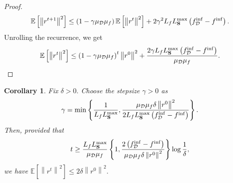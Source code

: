 \documentclass{article}
\newcommand{\bb}{\mathbb}
\newcommand{\Exp}[1]{{\bb E}\left[#1\right]}
\theoremstyle{plain}
\newtheorem{corollary}{Corollary}
\newcommand{\tf}{f_{\mathcal{D}}}
\newcommand{\mS}{{\bf S}}
\theoremstyle{plain}
\theoremstyle{definition}
\theoremstyle{remark}
\begin{document}
\begin{proof}
\begin{equation*}
	\begin{split}
		\Exp{\left\|r^{t+1}\right\|^2} & \leq \left(1-\gamma\mu_{\mathcal{D}}\mu_f\right)\Exp{\left\|r^{t}\right\|^2} + 2\gamma^2L_fL_{\mS}^{\max}\left(\tf^{\inf} - f^{\inf}\right).\\
	\end{split}
\end{equation*}
Unrolling the recurrence, we get
\begin{equation*}
	\Exp{\left\|r^{t}\right\|^2} \leq \left(1-\gamma\mu_{\mathcal{D}}\mu_f\right)^t\left\|r^0\right\|^2 + \frac{2\gamma L_fL_{\mS}^{\max}\left(\tf^{\inf} - f^{\inf}\right)}{\mu_{\mathcal{D}}\mu_f}.
\end{equation*}
\end{proof}
\begin{corollary}
	Fix $\delta > 0.$ Choose the stepsize $\gamma>0$ as
	\begin{equation*}
		\gamma = \min\left\lbrace \frac{1}{L_fL_{\mS}^{\max}}, \frac{\mu_{\mathcal{D}}\mu_f\delta\left\|r^0\right\|^2}{2L_fL_{\mS}^{\max}\left(\tf^{\inf} - f^{\inf}\right)}\right\rbrace.
	\end{equation*}
	Then, provided that
	\begin{equation*}
		t \geq \frac{L_fL_{\mS}^{\max}}{\mu_{\mathcal{D}}\mu_f}\left\lbrace 1, \frac{2\left(\tf^{\inf} - f^{\inf}\right)}{\mu_{\mathcal{D}}\mu_f\delta\left\|r^0\right\|^2}\right\rbrace \log\frac{1}{\delta},
	\end{equation*}
	we have $\Exp{\left\|r^{t}\right\|^2} \leq 2\delta\left\|r^0\right\|^2.$
\end{corollary}
\end{document}

